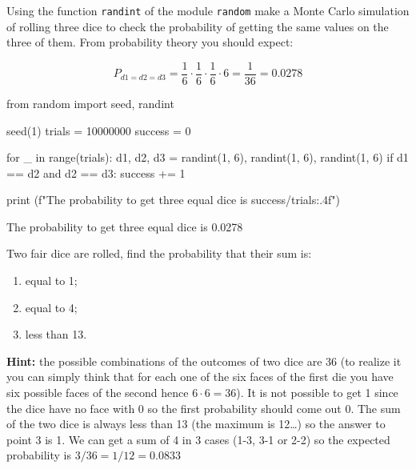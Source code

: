 \cprotEnv\begin{question}
Using the function \texttt{randint} of the module \texttt{random} make a Monte Carlo simulation of rolling three dice to check the probability of getting the same values on the three of them.
From probability theory you should expect:

\begin{equation*}
P_{d1=d2=d3} = \frac{1}{6}\cdot\frac{1}{6}\cdot\frac{1}{6}\cdot 6 = \frac{1}{36} = 0.0278
\end{equation*}
\end{question}

\cprotEnv\begin{solution}
\begin{ipython}
from random import seed, randint

seed(1)
trials = 10000000
success = 0

for _ in range(trials):
    d1, d2, d3 = randint(1, 6), randint(1, 6), randint(1, 6)
    if d1 == d2 and d2 == d3:
        success += 1

print (f"The probability to get three equal dice is {success/trials:.4f}")
\end{ipython}
\begin{ioutput}
The probability to get three equal dice is 0.0278
\end{ioutput}
\end{solution}

\begin{question}
Two fair dice are rolled, find the probability that their sum is:
\begin{enumerate}[start=1]
\item equal to 1;
\item equal to 4;
\item less than 13.
\end{enumerate}
	
\noindent\textbf{Hint:} the possible combinations of the outcomes of two dice are 36 (to realize it you can simply think that for each one of the six faces of the first die you have six possible faces of the second hence $6\cdot 6=36$). It is not possible to get 1 since the dice have no face with 0 so the first probability should come out 0. The sum of the two dice is always less than 13 (the maximum is 12\ldots) so the answer to point 3 is 1. We can get a sum of 4 in 3 cases (1-3, 3-1 or 2-2) so the expected probability is $3/36=1/12=0.0833$
\end{question}

